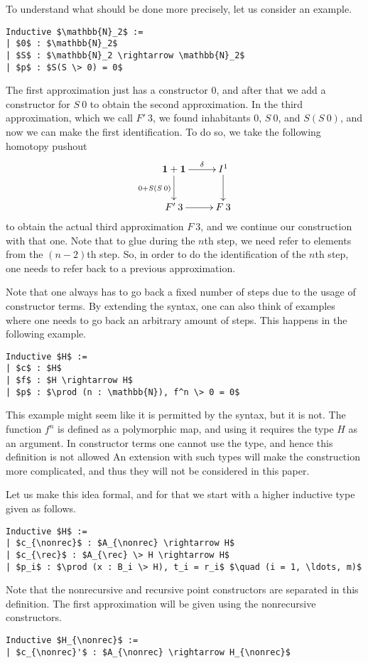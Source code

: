 \documentclass[a4paper,UKenglish]{lipics-v2016}
\newcommand{\one}[0]{\textbf{1}}
\newcommand{\rec}[0]{\operatorname{rec}}
\newcommand{\nonrec}[0]{\operatorname{nonrec}}
\begin{document}
To understand what should be done more precisely, let us consider an example.
\lstset{language=Coq}
\begin{lstlisting}
Inductive $\mathbb{N}_2$ :=
| $0$ : $\mathbb{N}_2$
| $S$ : $\mathbb{N}_2 \rightarrow \mathbb{N}_2$
| $p$ : $S(S \> 0) = 0$
\end{lstlisting}
The first approximation just has a constructor $0$, and after that we add a constructor for $S \> 0$ to obtain the second approximation.
In the third approximation, which we call $F' \> 3$, we found inhabitants $0$, $S \> 0$, and $S(S \> 0)$, and now we can make the first identification.
To do so, we take the following homotopy pushout
\[
\xymatrix
{
	\one + \one \ar[d]_{0 + S(S \> 0)} \ar[r]^-{\delta} & I^1 \ar[d]\\
	F' \> 3\ar[r] & F \> 3
}
\]
to obtain the actual third approximation $F \> 3$, and we continue our construction with that one.
Note that to glue during the $n$th step, we need refer to elements from the $(n-2)$th step.
So, in order to do the identification of the $n$th step, one needs to refer back to a previous approximation.

Note that one always has to go back a fixed number of steps due to the usage of constructor terms.
By extending the syntax, one can also think of examples where one needs to go back an arbitrary amount of steps.
This happens in the following example.
\lstset{language=Coq}
\begin{lstlisting}
Inductive $H$ :=
| $c$ : $H$
| $f$ : $H \rightarrow H$
| $p$ : $\prod (n : \mathbb{N}), f^n \> 0 = 0$
\end{lstlisting}
This example might seem like it is permitted by the syntax, but it is not.
The function $f^n$ is defined as a polymorphic map, and using it requires the type $H$ as an argument.
In constructor terms one cannot use the type, and hence this definition is not allowed
An extension with such types will make the construction more complicated, and thus they will not be considered in this paper.

Let us make this idea formal, and for that we start with a higher inductive type given as follows.
\lstset{language=Coq}
\begin{lstlisting}[label={lst:HIT}]
Inductive $H$ :=
| $c_{\nonrec}$ : $A_{\nonrec} \rightarrow H$
| $c_{\rec}$ : $A_{\rec} \> H \rightarrow H$
| $p_i$ : $\prod (x : B_i \> H), t_i = r_i$ $\quad (i = 1, \ldots, m)$
\end{lstlisting}
Note that the nonrecursive and recursive point constructors are separated in this definition.
The first approximation will be given using the nonrecursive constructors.
\lstset{language=Coq}
\begin{lstlisting}
Inductive $H_{\nonrec}$ :=
| $c_{\nonrec}'$ : $A_{\nonrec} \rightarrow H_{\nonrec}$
\end{lstlisting}
\end{document}
